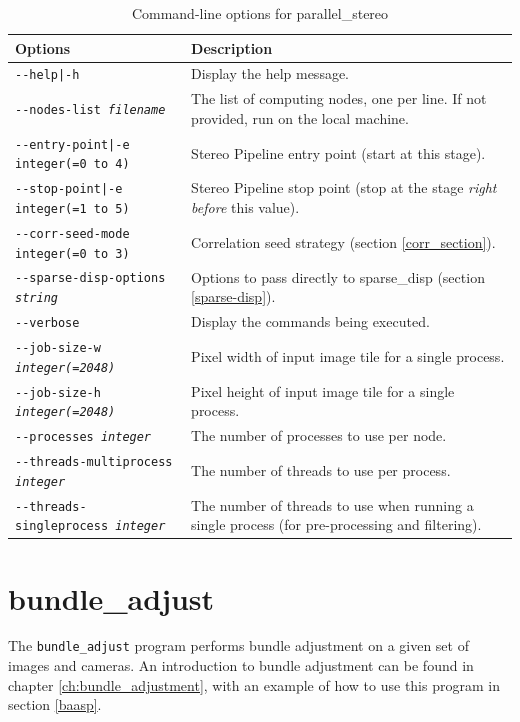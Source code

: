 \begin{longtable}{|l|p{7.5cm}|}
\caption{Command-line options for parallel\_stereo}
\label{tbl:parallelstereo}
\endfirsthead
\endhead
\endfoot
\endlastfoot
\hline
Options & Description \\ \hline \hline
\texttt{-\/-help|-h} & Display the help message.\\ \hline
\texttt{-\/-nodes-list \textit{filename} } & The list of computing nodes,
one per line. If not provided, run on the local machine. \\ \hline
\texttt{-\/-entry-point|-e integer(=0 to 4)} & Stereo Pipeline entry
point (start at this stage). \\ \hline
\texttt{-\/-stop-point|-e integer(=1 to 5)} & Stereo Pipeline stop point
(stop at the stage {\it right before} this value). \\ \hline
\texttt{-\/-corr-seed-mode integer(=0 to 3)} & Correlation seed strategy
(section \ref{corr_section}). \\ \hline
\texttt{-\/-sparse-disp-options \textit{string} } & Options to pass directly
to sparse\_disp (section \ref{sparse-disp}). \\ \hline
\texttt{-\/-verbose } & Display the commands being executed. \\ \hline
\texttt{-\/-job-size-w \textit{integer(=2048)}} & Pixel width of input
image tile for a single process. \\ \hline
\texttt{-\/-job-size-h \textit{integer(=2048)}} & Pixel height of input
image tile for a single process. \\ \hline
\texttt{-\/-processes \textit{integer}} & The number of processes to use per node. \\ \hline
\texttt{-\/-threads-multiprocess \textit{integer}} & The number of threads to use per process.\\ \hline
\texttt{-\/-threads-singleprocess \textit{integer}} & The number of threads to use when running a single process (for pre-processing and filtering).\\ \hline
\end{longtable}

\newpage
\section{bundle\_adjust}
\label{bundleadjust}

The \texttt{bundle\_adjust} program performs bundle adjustment on a
given set of images and cameras. An introduction to bundle adjustment
can be found in chapter \ref{ch:bundle_adjustment}, with an example of
how to use this program in section \ref{baasp}.

